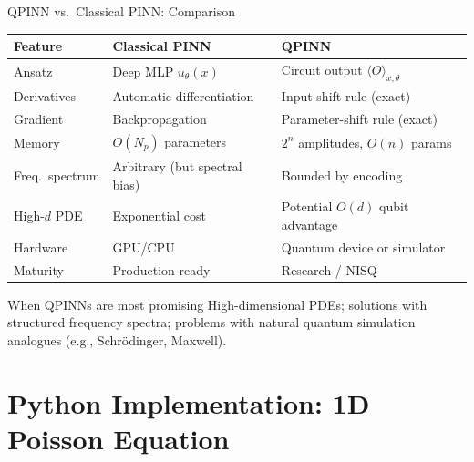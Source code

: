 \documentclass[aspectratio=169,10pt]{beamer}
\begin{document}
\begin{frame}{QPINN vs.\ Classical PINN: Comparison}
  \begin{center}
  \renewcommand{\arraystretch}{1.3}
  \begin{tabular}{p{3.2cm}p{4.8cm}p{4.8cm}}
    \toprule
    \textbf{Feature} & \textbf{Classical PINN} & \textbf{QPINN} \\
    \midrule
    Ansatz       & Deep MLP $u_\theta(x)$ &
                   Circuit output $\langle O\rangle_{x,\theta}$ \\
    Derivatives  & Automatic differentiation &
                   Input-shift rule (exact) \\
    Gradient     & Backpropagation &
                   Parameter-shift rule (exact) \\
    Memory       & $O(N_p)$ parameters &
                   $2^n$ amplitudes, $O(n)$ params \\
    Freq.\ spectrum & Arbitrary (but spectral bias) &
                   Bounded by encoding \\
    High-$d$ PDE & Exponential cost &
                   Potential $O(d)$ qubit advantage \\
    Hardware     & GPU/CPU & Quantum device or simulator \\
    Maturity     & Production-ready & Research / NISQ \\
    \bottomrule
  \end{tabular}
  \end{center}
  \vspace{0.2cm}
  \begin{alertblock}{When QPINNs are most promising}
    High-dimensional PDEs; solutions with structured
    frequency spectra; problems with natural quantum
    simulation analogues (e.g., Schrödinger, Maxwell).
  \end{alertblock}
\end{frame}

\section{Python Implementation: 1D Poisson Equation}
\end{document}
